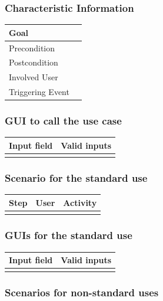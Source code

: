 \documentclass[12pt]{article}
\theoremstyle{definition}
\begin{document}
\subsubsection{Characteristic Information}

\begin{tabular}{|l|l|}
\hline
Goal &  \\ \hline
Precondition &  \\ \hline
Postcondition &  \\ \hline
Involved User &  \\ \hline
Triggering Event &  \\ \hline
\end{tabular}


\subsubsection{GUI to call the use case}

\begin{tabular}{|l|l|}
\hline
Input field & Valid inputs \\ \hline
 &  \\ \hline
\end{tabular}

\subsubsection{Scenario for the standard use}

\begin{tabular}{|l|l|l|}
\hline
Step & User & Activity \\ \hline
 & & \\ \hline
\end{tabular}

\subsubsection{GUIs for the standard use}

\begin{tabular}{|l|l|}
\hline
Input field & Valid inputs \\ \hline
 &  \\ \hline
\end{tabular}

\subsubsection{Scenarios for non-standard uses}
\end{document}
